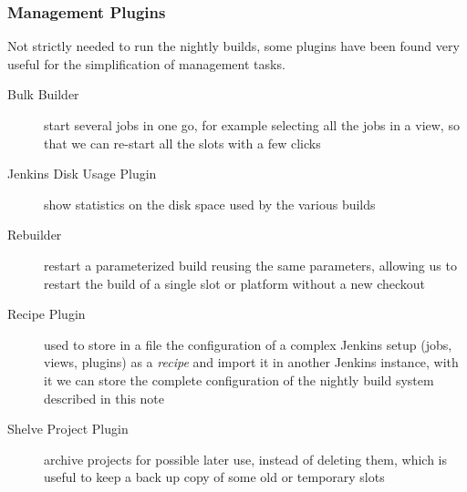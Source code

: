 \subsubsection{Management Plugins}
\label{sec:Jenkins:Management}
Not strictly needed to run the nightly builds, some plugins have been found very
useful for the simplification of management tasks.
\begin{description}
  \item[Bulk Builder] start several jobs in one go, for example selecting all
the jobs in a view, so that we can re-start all the slots with a few clicks
  \item[Jenkins Disk Usage Plugin] show statistics on the disk space used by the
various builds
  \item[Rebuilder] restart a parameterized build reusing the same parameters,
allowing us to restart the build of a single slot or platform without a new
checkout
  \item[Recipe Plugin] used to store in a file the configuration of a complex
Jenkins setup (jobs, views, plugins) as a \emph{recipe} and import it in another
Jenkins instance, with it we can store the complete configuration of the nightly
build system described in this note
  \item[Shelve Project Plugin] archive projects for possible later use, instead
of deleting them, which is useful to keep a back up copy of some old or
temporary slots
\end{description}
